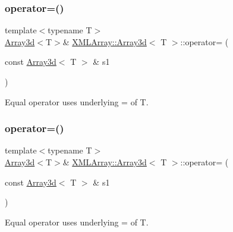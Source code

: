 \subsubsection{\texorpdfstring{operator=()}{operator=()}\hspace{0.1cm}{\footnotesize\ttfamily [1/6]}}
{\footnotesize\ttfamily template$<$typename T$>$ \\
\mbox{\hyperlink{classXMLArray_1_1Array3d}{Array3d}}$<$T$>$\& \mbox{\hyperlink{classXMLArray_1_1Array3d}{X\+M\+L\+Array\+::\+Array3d}}$<$ T $>$\+::operator= (\begin{DoxyParamCaption}\item[{const \mbox{\hyperlink{classXMLArray_1_1Array3d}{Array3d}}$<$ T $>$ \&}]{s1 }\end{DoxyParamCaption})\hspace{0.3cm}{\ttfamily [inline]}}



Equal operator uses underlying = of T. 

\mbox{\label{classXMLArray_1_1Array3d_a797bc6cb731b7e9a8fbe0bf72d87678e}} 
\subsubsection{\texorpdfstring{operator=()}{operator=()}\hspace{0.1cm}{\footnotesize\ttfamily [2/6]}}
{\footnotesize\ttfamily template$<$typename T$>$ \\
\mbox{\hyperlink{classXMLArray_1_1Array3d}{Array3d}}$<$T$>$\& \mbox{\hyperlink{classXMLArray_1_1Array3d}{X\+M\+L\+Array\+::\+Array3d}}$<$ T $>$\+::operator= (\begin{DoxyParamCaption}\item[{const \mbox{\hyperlink{classXMLArray_1_1Array3d}{Array3d}}$<$ T $>$ \&}]{s1 }\end{DoxyParamCaption})\hspace{0.3cm}{\ttfamily [inline]}}



Equal operator uses underlying = of T. 

\mbox{\label{classXMLArray_1_1Array3d_a797bc6cb731b7e9a8fbe0bf72d87678e}} 

